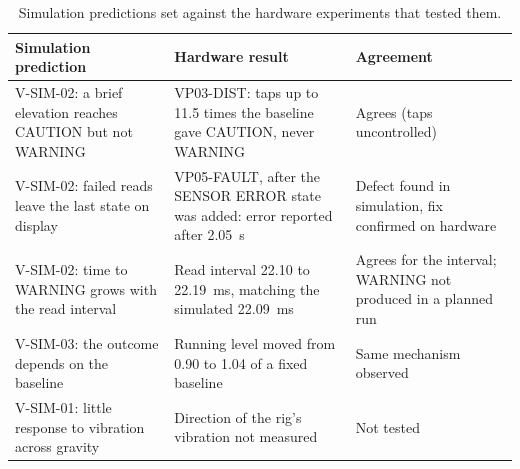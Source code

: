 \begin{table}[H]
\centering\begingroup\methodtabset
\caption{Simulation predictions set against the hardware experiments that tested them.}
\label{tab:res-vib-validation}
\begin{tabularx}{\linewidth}{|Q{4.0cm}|Z|Q{2.6cm}|}
\hline
\textbf{Simulation prediction} & \textbf{Hardware result} & \textbf{Agreement} \\
\hline
V-SIM-02: a brief elevation reaches CAUTION but not WARNING & VP03-DIST: taps up to 11.5 times the baseline gave CAUTION, never WARNING & Agrees (taps uncontrolled) \\ \hline
V-SIM-02: failed reads leave the last state on display & VP05-FAULT, after the SENSOR ERROR state was added: error reported after 2.05~s & Defect found in simulation, fix confirmed on hardware \\ \hline
V-SIM-02: time to WARNING grows with the read interval & Read interval 22.10 to 22.19~ms, matching the simulated 22.09~ms & Agrees for the interval; WARNING not produced in a planned run \\ \hline
V-SIM-03: the outcome depends on the baseline & Running level moved from 0.90 to 1.04 of a fixed baseline & Same mechanism observed \\ \hline
V-SIM-01: little response to vibration across gravity & Direction of the rig's vibration not measured & Not tested \\ \hline
\end{tabularx}
\endgroup
\end{table}

